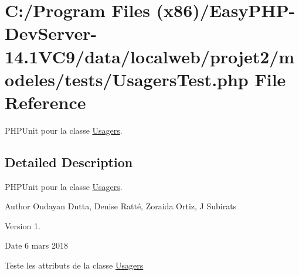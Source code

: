 \hypertarget{_usagers_test_8php}{}\section{C\+:/\+Program Files (x86)/\+Easy\+P\+H\+P-\/\+Dev\+Server-\/14.1\+V\+C9/data/localweb/projet2/modeles/tests/\+Usagers\+Test.php File Reference}
\label{_usagers_test_8php}


P\+H\+P\+Unit pour la classe \hyperlink{class_usagers}{Usagers}.  




\subsection{Detailed Description}
P\+H\+P\+Unit pour la classe \hyperlink{class_usagers}{Usagers}. 

\begin{DoxyAuthor}{Author}
Oudayan Dutta, Denise Ratté, Zoraida Ortiz, J Subirats 
\end{DoxyAuthor}
\begin{DoxyVersion}{Version}
1. 
\end{DoxyVersion}
\begin{DoxyDate}{Date}
6 mars 2018
\end{DoxyDate}
Teste les attributs de la classe \hyperlink{class_usagers}{Usagers} 